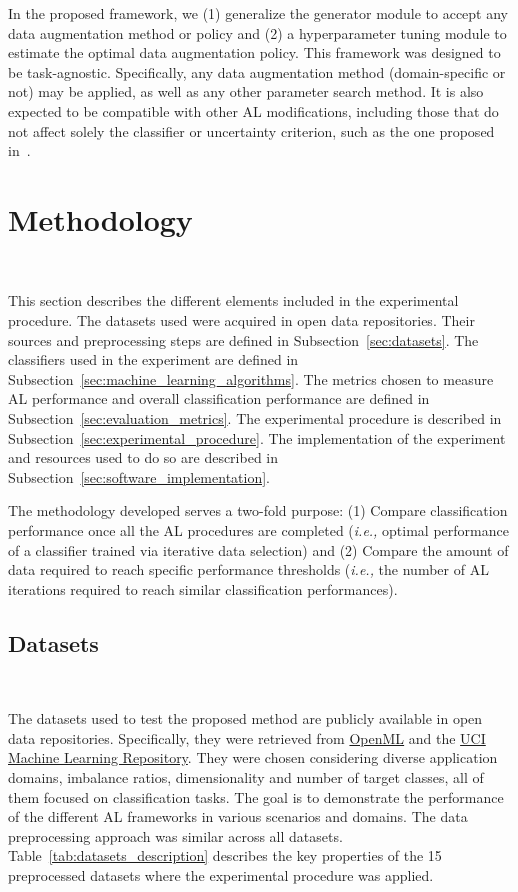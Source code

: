 \documentclass[10pt,journal,compsoc]{IEEEtran}
\begin{document}
In the proposed framework, we (1) generalize the generator module to accept
any data augmentation method or policy and (2) a hyperparameter tuning module
to estimate the optimal data augmentation policy. This framework was designed
to be task-agnostic. Specifically, any data augmentation method
(domain-specific or not) may be applied, as well as any other parameter search
method. It is also expected to be compatible with other AL modifications,
including those that do not affect solely the classifier or uncertainty
criterion, such as the one proposed in~\cite{Yoo2019}.
 
\section{Methodology}~\label{sec:methodology}

This section describes the different elements included in the experimental
procedure. The datasets used were acquired in open data repositories. Their
sources and preprocessing steps are defined in Subsection~\ref{sec:datasets}.
The classifiers used in the experiment are defined in
Subsection~\ref{sec:machine_learning_algorithms}. The metrics chosen to
measure AL performance and overall classification performance are defined in
Subsection~\ref{sec:evaluation_metrics}. The experimental procedure is
described in Subsection~\ref{sec:experimental_procedure}. The implementation
of the experiment and resources used to do so are described in
Subsection~\ref{sec:software_implementation}.

The methodology developed serves a two-fold purpose: (1) Compare
classification performance once all the AL procedures are completed
(\textit{i.e.,} optimal performance of a classifier trained via iterative data
selection) and (2) Compare the amount of data required to reach specific
performance thresholds (\textit{i.e.,} the number of AL iterations required to
reach similar classification performances).
 
\subsection{Datasets}~\label{sec:datasets}

The datasets used to test the proposed method are publicly available in open
data repositories. Specifically, they were retrieved from
\href{https://www.openml.org/}{OpenML} and the
\href{https://archive.ics.uci.edu/}{UCI Machine Learning Repository}. They
were chosen considering diverse application domains, imbalance ratios,
dimensionality and number of target classes, all of them focused on
classification tasks. The goal is to demonstrate the performance of the
different AL frameworks in various scenarios and domains. The data
preprocessing approach was similar across all datasets.
Table~\ref{tab:datasets_description} describes the key properties of the
15 preprocessed datasets where the experimental procedure was applied. 
 
\end{document}

